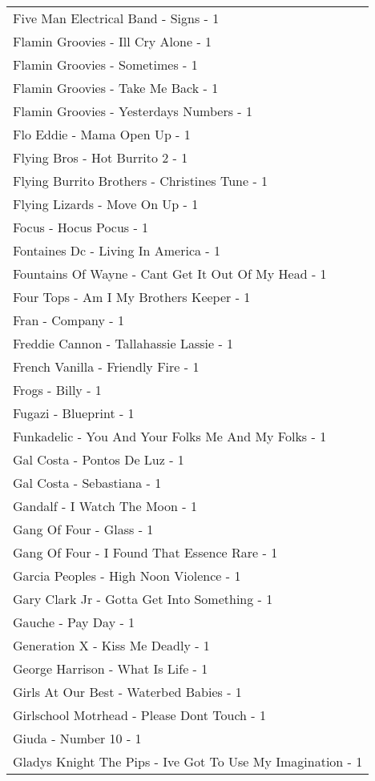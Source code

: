 \documentclass[
]{article}
\begin{document}
\begin{longtable}{l}
Five Man Electrical Band - Signs - 1 \\ 
Flamin Groovies - Ill Cry Alone - 1 \\ 
Flamin Groovies - Sometimes - 1 \\ 
Flamin Groovies - Take Me Back - 1 \\ 
Flamin Groovies - Yesterdays Numbers - 1 \\ 
Flo Eddie - Mama Open Up - 1 \\ 
Flying Bros - Hot Burrito 2 - 1 \\ 
Flying Burrito Brothers - Christines Tune - 1 \\ 
Flying Lizards - Move On Up - 1 \\ 
Focus - Hocus Pocus - 1 \\ 
Fontaines Dc - Living In America - 1 \\ 
Fountains Of Wayne - Cant Get It Out Of My Head - 1 \\ 
Four Tops - Am I My Brothers Keeper - 1 \\ 
Fran - Company - 1 \\ 
Freddie Cannon - Tallahassie Lassie - 1 \\ 
French Vanilla - Friendly Fire - 1 \\ 
Frogs - Billy - 1 \\ 
Fugazi - Blueprint - 1 \\ 
Funkadelic - You And Your Folks Me And My Folks - 1 \\ 
Gal Costa - Pontos De Luz - 1 \\ 
Gal Costa - Sebastiana - 1 \\ 
Gandalf - I Watch The Moon - 1 \\ 
Gang Of Four - Glass - 1 \\ 
Gang Of Four - I Found That Essence Rare - 1 \\ 
Garcia Peoples - High Noon Violence - 1 \\ 
Gary Clark Jr - Gotta Get Into Something - 1 \\ 
Gauche - Pay Day - 1 \\ 
Generation X - Kiss Me Deadly - 1 \\ 
George Harrison - What Is Life - 1 \\ 
Girls At Our Best - Waterbed Babies - 1 \\ 
Girlschool Motrhead - Please Dont Touch - 1 \\ 
Giuda - Number 10 - 1 \\ 
Gladys Knight The Pips - Ive Got To Use My Imagination - 1 \\ 

\end{longtable}
\end{document}
